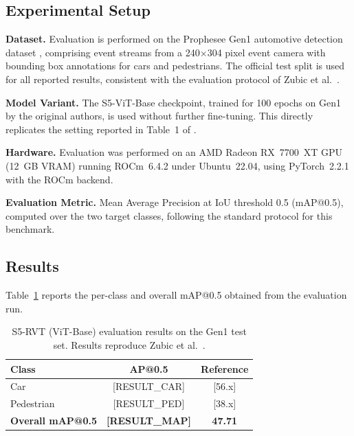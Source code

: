 \documentclass[11pt, a4paper]{report}
\begin{document}
\subsection{Experimental Setup}
\label{subsec:mvp_setup}

\textbf{Dataset.} Evaluation is performed on the Prophesee Gen1 automotive detection dataset \cite{perot2020learning}, comprising event streams from a 240$\times$304 pixel event camera with bounding box annotations for cars and pedestrians. The official test split is used for all reported results, consistent with the evaluation protocol of Zubic et al.\ \cite{zubic2024state}.

\textbf{Model Variant.} The S5-ViT-Base checkpoint, trained for 100 epochs on Gen1 by the original authors, is used without further fine-tuning. This directly replicates the setting reported in Table~1 of \cite{zubic2024state}.

\textbf{Hardware.} Evaluation was performed on an AMD Radeon RX~7700~XT GPU (12~GB VRAM) running ROCm~6.4.2 under Ubuntu~22.04, using PyTorch~2.2.1 with the ROCm backend.

\textbf{Evaluation Metric.} Mean Average Precision at IoU threshold 0.5 (mAP@0.5), computed over the two target classes, following the standard protocol for this benchmark.

\subsection{Results}
\label{subsec:mvp_results}

Table~\ref{tab:mvp_results} reports the per-class and overall mAP@0.5 obtained from the evaluation run.

\begin{table}[h]
\centering
\caption{S5-RVT (ViT-Base) evaluation results on the Gen1 test set. Results reproduce Zubic et al.\ \cite{zubic2024state}.}
\label{tab:mvp_results}
\renewcommand{\arraystretch}{1.4}
\begin{tabular}{lcc}
\toprule
\textbf{Class} & \textbf{AP@0.5} & \textbf{Reference} \\
\midrule
Car         & [RESULT\_CAR]  & [56.x] \\
Pedestrian  & [RESULT\_PED]  & [38.x] \\
\midrule
\textbf{Overall mAP@0.5} & \textbf{[RESULT\_MAP]} & \textbf{47.71} \\
\bottomrule
\end{tabular}
\end{table}
\end{document}
